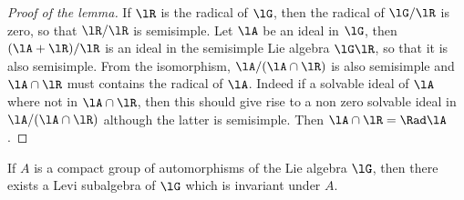 \begin{proof}[Proof of the lemma]
If $\lR$ is the radical of $\lG$, then the radical of $\lG/\lR$ is zero, so that $\lR/\lR$ is semisimple. Let $\lA$ be an ideal in $\lG$, then $(\lA+\lR)/\lR$ is an ideal in the semisimple Lie algebra $\lG\lR$, so that it is also semisimple. From the isomorphism, $\lA/(\lA\cap\lR)$ is also semisimple and $\lA\cap\lR$ must contains the radical of $\lA$. Indeed if a solvable ideal of $\lA$ where not in $\lA\cap\lR$, then this should give rise to a non zero solvable ideal in $\lA/(\lA\cap\lR)$ although the latter is semisimple. Then $\lA\cap\lR=\Rad\lA$.
\end{proof}

\begin{proposition}
If $A$ is a compact group of automorphisms of the Lie algebra $\lG$, then there exists a Levi subalgebra of $\lG$ which is invariant under $A$.
\end{proposition}

